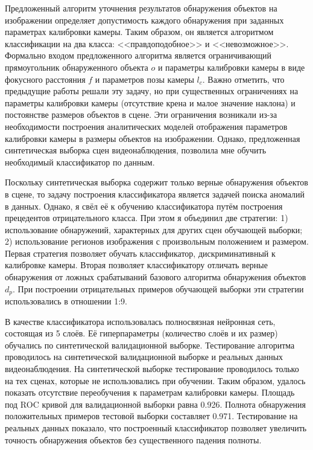Предложенный алгоритм уточнения результатов обнаружения объектов на изображении определяет допустимость каждого обнаружения при заданных параметрах калибровки камеры. Таким образом, он является алгоритмом классификации на два класса: <<правдоподобное>> и <<невозможное>>. Формально входом предложенного алгоритма является ограничивающий прямоугольник обнаруженного объекта $o$ и параметры калибровки камеры в виде фокусного расстояния $f$ и параметров позы камеры $l_c$. Важно отметить, что предыдущие работы решали эту задачу, но при существенных ограничениях на параметры калибровки камеры (отсутствие крена и малое значение наклона) и постоянстве размеров объектов в сцене. Эти ограничения возникали из-за необходимости построения аналитических моделей отображения параметров калибровки камеры в размеры объектов на изображении. Однако, предложенная синтетическая выборка сцен видеонаблюдения, позволила мне обучить необходимый классификатор по данным.

Поскольку синтетическая выборка содержит только верные обнаружения объектов в сцене, то задачу построения классификатора является задачей поиска аномалий в данных. Однако, я свёл её к обучению классификатора путём построения прецедентов отрицательного класса. При этом я объединил две стратегии: 1) использование обнаружений, характерных для других сцен обучающей выборки; 2) использование регионов изображения с произвольным положением и размером. Первая стратегия позволяет обучать классификатор, дискриминативный к калибровке камеры. Вторая позволяет классификатору отличать верные обнаружения от ложных срабатываний базового алгоритма обнаружения объектов $d_p$. При построении отрицательных примеров обучающей выборки эти стратегии использовались в отношении 1:9.

В качестве классификатора использовалась полносвязная нейронная сеть, состоящая из 5 слоёв. Её гиперпараметры (количество слоёв и их размер) обучались по синтетической валидационной выборке. Тестирование алгоритма проводилось на синтетической валидационной выборке и реальных данных видеонаблюдения.  На синтетической выборке тестирование проводилось только на тех сценах, которые не использовались при обучении. Таким образом, удалось показать отсутствие переобучения к параметрам калибровки камеры. Площадь под ROC кривой для валидационной выборки равна 0.926. Полнота обнаружения положительных примеров тестовой выборки составляет 0.971. Тестирование на реальных данных показало, что построенный классификатор позволяет увеличить точность обнаружения объектов без существенного падения полноты.

